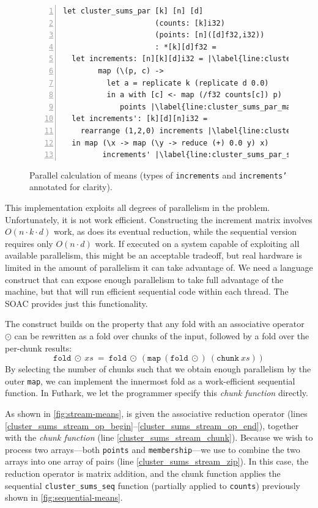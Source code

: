 \begin{figure}
\begin{lstlisting}[numbers=left,escapechar=|,xleftmargin=0pt]
let cluster_sums_par [k] [n] [d]
                     (counts: [k]i32)
                     (points: [n]([d]f32,i32))
                     : *[k][d]f32 =
  let increments: [n][k][d]i32 = |\label{line:cluster_sums_par_map_begin}|
        map (\(p, c) ->
          let a = replicate k (replicate d 0.0)
          in a with [c] <- map (/f32 counts[c]) p)
             points |\label{line:cluster_sums_par_map_end}|
  let increments': [k][d][n]i32 =
    rearrange (1,2,0) increments |\label{line:cluster_sums_par_sum_begin}|
  in map (\x -> map (\y -> reduce (+) 0.0 y) x)
         increments' |\label{line:cluster_sums_par_sum_end}|
\end{lstlisting}
  \caption{Parallel calculation of means (types of \texttt{increments}
    and \texttt{increments'} annotated for clarity).}
\label{fig:parallel-means}
\end{figure}

This implementation exploits all degrees of parallelism in the
problem.  Unfortunately, it is not work efficient.  Constructing the
increment matrix involves
$O(n\cdot{}k\cdot{}d)$ work, as does its eventual reduction, while the
sequential version requires only
$O(n\cdot{}d)$ work.  If executed on a system capable of exploiting
all available parallelism, this might be an acceptable tradeoff, but
real hardware is limited in the amount of parallelism it can take
advantage of.  We need a language construct that can expose enough
parallelism to take full advantage of the machine, but that will run
efficient sequential code within each thread.  The \StreamRed{} SOAC
provides just this functionality.

The \StreamRed{} construct builds on the property that any fold
with an associative operator $\odot$ can be rewritten as a fold over
chunks of the input, followed by a fold over the per-chunk results:
\[
   \texttt{fold}\ \odot\ xs\ =\ \texttt{fold}\ \odot\ (\texttt{map}\ (\texttt{fold}\ \odot)\ (\texttt{chunk}\ xs))
\]
By selecting the number of chunks such that we obtain enough
parallelism by the outer \texttt{map}, we can implement the innermost
fold as a work-efficient sequential function.  In Futhark, we let the
programmer specify this \textit{chunk function} directly.

As shown in \cref{fig:stream-means}, \StreamRed{} is given the
associative reduction operator (lines
\ref{cluster_sums_stream_op_begin}--\ref{cluster_sums_stream_op_end}),
together with the \textit{chunk function} (line
\ref{cluster_sums_stream_chunk}).  Because we wish to process two
arrays---both \texttt{points} and \texttt{membership}---we use
 to combine the two arrays into one array of pairs (line
\ref{cluster_sums_stream_zip}).  In this case, the reduction operator
is matrix addition, and the chunk function applies the sequential
\lstinline{cluster_sums_seq} function (partially applied to
\lstinline{counts}) previously shown in \cref{fig:sequential-means}.

